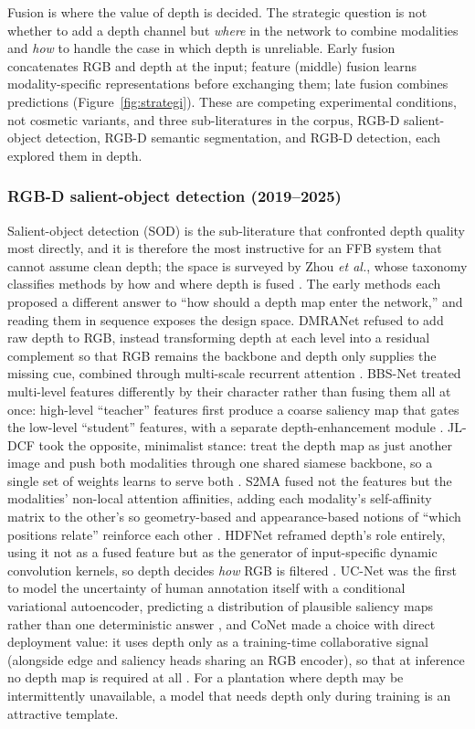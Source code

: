 Fusion is where the value of depth is decided. The strategic question is not whether to add a depth channel but \emph{where} in the network to combine modalities and \emph{how} to handle the case in which depth is unreliable. Early fusion concatenates RGB and depth at the input; feature (middle) fusion learns modality-specific representations before exchanging them; late fusion combines predictions (Figure~\ref{fig:strategi}). These are competing experimental conditions, not cosmetic variants, and three sub-literatures in the corpus, RGB-D salient-object detection, RGB-D semantic segmentation, and RGB-D detection, each explored them in depth.

\subsubsection{RGB-D salient-object detection (2019--2025)}

Salient-object detection (SOD) is the sub-literature that confronted depth quality most directly, and it is therefore the most instructive for an FFB system that cannot assume clean depth; the space is surveyed by Zhou \textit{et al.}, whose taxonomy classifies methods by how and where depth is fused \cite{zhou2021rgbdsurvey}. The early methods each proposed a different answer to ``how should a depth map enter the network,'' and reading them in sequence exposes the design space. DMRANet refused to add raw depth to RGB, instead transforming depth at each level into a residual complement so that RGB remains the backbone and depth only supplies the missing cue, combined through multi-scale recurrent attention \cite{piao2019dmra}. BBS-Net treated multi-level features differently by their character rather than fusing them all at once: high-level ``teacher'' features first produce a coarse saliency map that gates the low-level ``student'' features, with a separate depth-enhancement module \cite{fan2020bbsnet}. JL-DCF took the opposite, minimalist stance: treat the depth map as just another image and push both modalities through one shared siamese backbone, so a single set of weights learns to serve both \cite{fu2020jldcf}. S2MA fused not the features but the modalities' non-local attention affinities, adding each modality's self-affinity matrix to the other's so geometry-based and appearance-based notions of ``which positions relate'' reinforce each other \cite{liu2020s2ma}. HDFNet reframed depth's role entirely, using it not as a fused feature but as the generator of input-specific dynamic convolution kernels, so depth decides \emph{how} RGB is filtered \cite{pang2020hdfnet}. UC-Net was the first to model the uncertainty of human annotation itself with a conditional variational autoencoder, predicting a distribution of plausible saliency maps rather than one deterministic answer \cite{zhang2020ucnet}, and CoNet made a choice with direct deployment value: it uses depth only as a training-time collaborative signal (alongside edge and saliency heads sharing an RGB encoder), so that at inference no depth map is required at all \cite{ji2020conet}. For a plantation where depth may be intermittently unavailable, a model that needs depth only during training is an attractive template.

